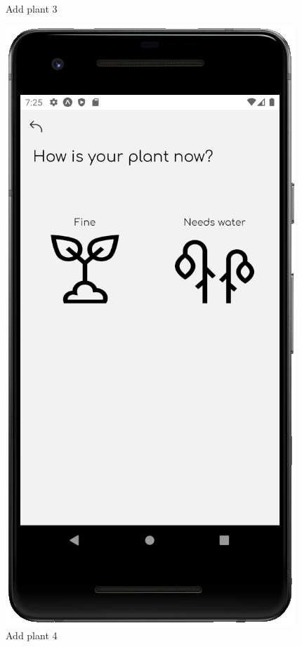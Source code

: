 \documentclass[10pt]{article}
\begin{document}
\begin{figure}[h]
\begin{minipage}[h]{0.4\textwidth}
         \caption{Add plant 3}
     \end{minipage}%
     \hfill
     \begin{minipage}[h]{0.4\textwidth}
         \centering
         \includegraphics[width=\textwidth]{resources/screens/AddPlant4.PNG}
         \caption{Add plant 4}
     \end{minipage}
    \end{figure}
    \clearpage
\end{document}
